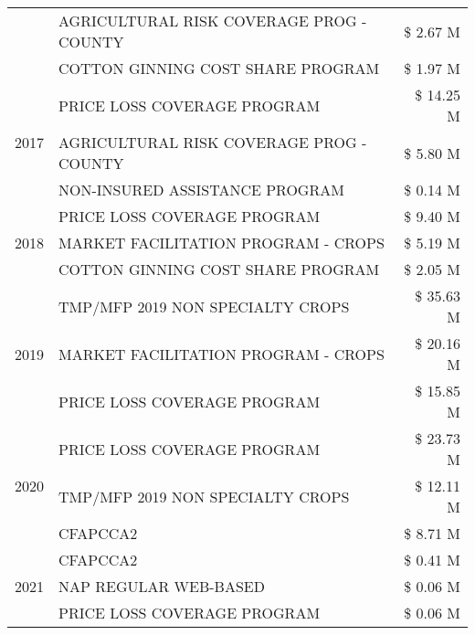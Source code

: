 \begin{tabular}{llr}
 & AGRICULTURAL RISK COVERAGE PROG - COUNTY      & \$ 2.67 M \\
 & COTTON GINNING COST SHARE PROGRAM             & \$ 1.97 M \\
\cline{1-3}
\multirow[t]{3}{*}{2017} & PRICE LOSS COVERAGE PROGRAM & \$ 14.25 M \\
 & AGRICULTURAL RISK COVERAGE PROG - COUNTY & \$ 5.80 M \\
 & NON-INSURED ASSISTANCE PROGRAM & \$ 0.14 M \\
\cline{1-3}
\multirow[t]{3}{*}{2018} & PRICE LOSS COVERAGE PROGRAM & \$ 9.40 M \\
 & MARKET FACILITATION PROGRAM - CROPS & \$ 5.19 M \\
 & COTTON GINNING COST SHARE PROGRAM & \$ 2.05 M \\
\cline{1-3}
\multirow[t]{3}{*}{2019} & TMP/MFP 2019 NON SPECIALTY CROPS & \$ 35.63 M \\
 & MARKET FACILITATION PROGRAM - CROPS & \$ 20.16 M \\
 & PRICE LOSS COVERAGE PROGRAM & \$ 15.85 M \\
\cline{1-3}
\multirow[t]{3}{*}{2020} & PRICE LOSS COVERAGE PROGRAM & \$ 23.73 M \\
 & TMP/MFP 2019 NON SPECIALTY CROPS & \$ 12.11 M \\
 & CFAPCCA2 & \$ 8.71 M \\
\cline{1-3}
\multirow[t]{3}{*}{2021} & CFAPCCA2 & \$ 0.41 M \\
 & NAP REGULAR WEB-BASED & \$ 0.06 M \\
 & PRICE LOSS COVERAGE PROGRAM & \$ 0.06 M \\
\cline{1-3}
\bottomrule
\end{tabular}
